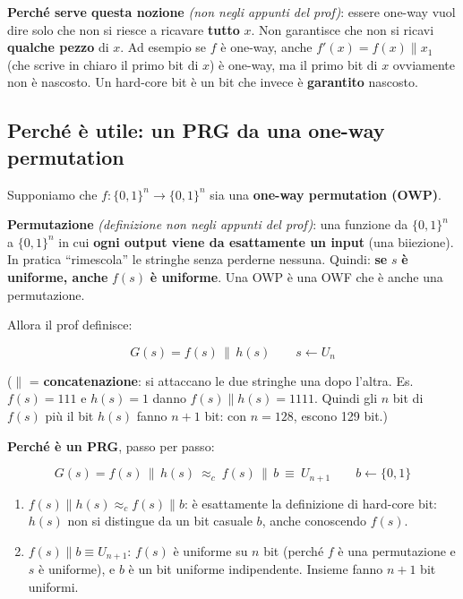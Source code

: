 \textbf{Perché serve questa nozione} \emph{(non negli appunti del prof)}: essere one-way vuol dire solo che non si riesce a ricavare \textbf{tutto} \(x\). Non garantisce che non si ricavi \textbf{qualche pezzo} di \(x\). Ad esempio se \(f\) è one-way, anche \(f'(x) = f(x) \| x_1\) (che scrive in chiaro il primo bit di \(x\)) è one-way, ma il primo bit di \(x\) ovviamente non è nascosto. Un hard-core bit è un bit che invece è \textbf{garantito} nascosto.

\subsection{Perché è utile: un PRG da una one-way permutation}

Supponiamo che \(f : \{0,1\}^n \to \{0,1\}^n\) sia una \textbf{one-way permutation (OWP)}.

\begin{nota}

\textbf{Permutazione} \emph{(definizione non negli appunti del prof)}: una funzione da \(\{0,1\}^n\) a \(\{0,1\}^n\) in cui \textbf{ogni output viene da esattamente un input} (una biiezione). In pratica ``rimescola'' le stringhe senza perderne nessuna. Quindi: \textbf{se} \(s\) \textbf{è uniforme, anche} \(f(s)\) \textbf{è uniforme}. Una OWP è una OWF che è anche una permutazione.

\end{nota}

Allora il prof definisce:

\[
G(s) = f(s) \,\|\, h(s) \qquad s \leftarrow U_n
\]

(\(\|\) = \textbf{concatenazione}: si attaccano le due stringhe una dopo l'altra. Es. \(f(s) = 111\) e \(h(s) = 1\) danno \(f(s) \| h(s) = 1111\). Quindi gli \(n\) bit di \(f(s)\) più il bit \(h(s)\) fanno \(n+1\) bit: con \(n = 128\), escono 129 bit.)

\textbf{Perché è un PRG}, passo per passo:

\[
G(s) = f(s) \,\|\, h(s) \ \approx_c \ f(s) \,\|\, b \ \equiv \ U_{n+1} \qquad b \leftarrow \{0,1\}
\]

\begin{enumerate}
\def\labelenumi{\arabic{enumi}.}
\tightlist
\item
  \(f(s) \| h(s) \approx_c f(s) \| b\): è esattamente la definizione di hard-core bit: \(h(s)\) non si distingue da un bit casuale \(b\), anche conoscendo \(f(s)\).
\item
  \(f(s) \| b \equiv U_{n+1}\): \(f(s)\) è uniforme su \(n\) bit (perché \(f\) è una permutazione e \(s\) è uniforme), e \(b\) è un bit uniforme indipendente. Insieme fanno \(n + 1\) bit uniformi.
\end{enumerate}


